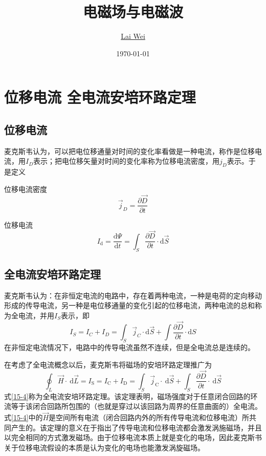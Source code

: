 \documentclass[12pt]{article}
\title{电磁场与电磁波}
\author{\href{mailto:lai-wei@whu.edu.cn}{Lai Wei}}
\date{\today}
\newcommand{\rmd}{\mathrm{d}}
\newcommand{\deriv}[2]{\frac{\rmd #1}{\rmd #2}}
\newcommand{\pderiv}[2]{\frac{\partial #1}{\partial #2}}
\begin{document}
\maketitle

\section{位移电流 \quad 全电流安培环路定理}

\subsection{位移电流}

麦克斯韦认为，可以把电位移通量对时间的变化率看做是一种电流，称作是位移电流，用\(I_D\)表示；把电位移矢量对时间的变化率称为位移电流密度，用\(j_D\)表示。于是定义

位移电流密度
\begin{equation}
    \overrightarrow{j}_D = \pderiv{\overrightarrow{D}}{t}
\end{equation}

位移电流
\begin{equation}
I_{\mathrm{d}}=\deriv{\varPsi}{t} = \int_S \pderiv{\overrightarrow{D}}{t} \cdot \rmd \overrightarrow{S}
\end{equation}

\subsection{全电流安培环路定理}

麦克斯韦认为：在非恒定电流的电路中，存在着两种电流，一种是电荷的定向移动形成的传导电流，另一种是电位移通量的变化引起的位移电流，两种电流的总和称为全电流，并用\(I_S\)表示，即
\begin{equation}
    I_S = I_C + I_D = \int_S \overrightarrow{j}_C \cdot \rmd \overrightarrow{S} + \int \pderiv{\overrightarrow{D}}{t} \cdot \rmd S
\end{equation}
在非恒定电流情况下，电路中的传导电流虽然不连续，但是全电流总是连续的。

在考虑了全电流概念以后，麦克斯韦将磁场的安培环路定理推广为
\begin{equation}
\oint_L \overrightarrow{H} \cdot \mathrm{~d} \overrightarrow{L}=I_{\mathrm{S}}=I_{\mathrm{C}}+I_{\mathrm{D}}=\int_S \overrightarrow{j}_{\mathrm{C}} \cdot \mathrm{~d} \overrightarrow{S}+\int_S \frac{\partial \overrightarrow{D}}{\partial t} \cdot \mathrm{~d} \overrightarrow{S}
\label{15-4}
\end{equation}
式\ref{15-4}称为全电流安培环路定理。该定理表明，磁场强度对于任意闭合回路的环流等于该闭合回路所包围的（也就是穿过以该回路为周界的任意曲面的）全电流。式\ref{15-4}中的\(\overrightarrow{H}\)是空间所有电流（闭合回路内外的所有传导电流和位移电流）所共同产生的。该定理的意义在于指出了传导电流和位移电流都会激发涡施磁场，并且以完全相同的方式激发磁场。由于位移电流本质上就是变化的电场，因此麦克斯书关于位移电流假设的本质是认为变化的电场也能激发涡旋磁场。
\end{document}
